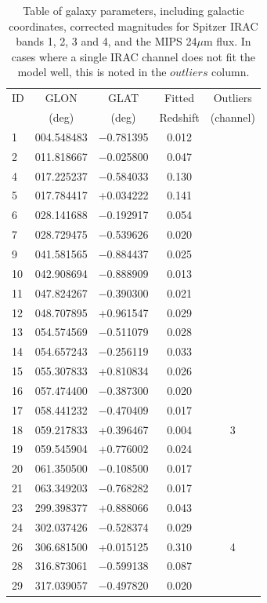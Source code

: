 \documentclass[times,usenatbib]{mn2e}
\begin{document}
\begin{table}
\begin{center}
\caption{Table of galaxy parameters, including galactic coordinates, corrected magnitudes for Spitzer IRAC bands 1, 2, 3 and 4, and the MIPS 24$\mu$m flux. In cases where a single IRAC channel does not fit the model well, this is noted in the $outliers$ column.}
\begin{tabular}{lcccc}
\hline
ID & GLON & GLAT & Fitted & Outliers \\
 & (deg) & (deg) & Redshift & (channel) \\
\hline
 1 & 004.548483 & $-$0.781395 & 0.012 & \\
 2 & 011.818667 & $-$0.025800 & 0.047 & \\
 4 & 017.225237 & $-$0.584033 & 0.130 & \\
 5 & 017.784417 &   +0.034222 & 0.141 & \\
 6 & 028.141688 & $-$0.192917 & 0.054 & \\
 7 & 028.729475 & $-$0.539626 & 0.020 & \\
 9 & 041.581565 & $-$0.884437 & 0.025 & \\
10 & 042.908694 & $-$0.888909 & 0.013 & \\
11 & 047.824267 & $-$0.390300 & 0.021 & \\
12 & 048.707895 &   +0.961547 & 0.029 & \\
13 & 054.574569 & $-$0.511079 & 0.028 & \\
14 & 054.657243 & $-$0.256119 & 0.033 & \\
15 & 055.307833 &   +0.810834 & 0.026 & \\
16 & 057.474400 & $-$0.387300 & 0.020 & \\
17 & 058.441232 & $-$0.470409 & 0.017 & \\
18 & 059.217833 &   +0.396467 & 0.004 & 3 \\
19 & 059.545904 &   +0.776002 & 0.024 & \\
20 & 061.350500 & $-$0.108500 & 0.017 & \\
21 & 063.349203 & $-$0.768282 & 0.017 & \\
23 & 299.398377 &   +0.888066 & 0.043 & \\
24 & 302.037426 & $-$0.528374 & 0.029 & \\
26 & 306.681500 &   +0.015125 & 0.310 & 4 \\
28 & 316.873061 & $-$0.599138 & 0.087 & \\
29 & 317.039057 & $-$0.497820 & 0.020 & \\

\end{tabular}
\end{center}
\end{table}
\end{document}
